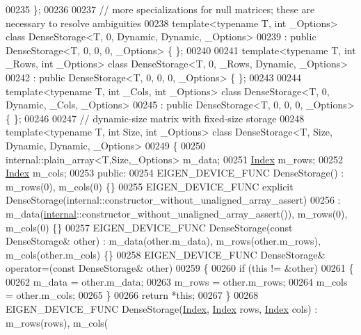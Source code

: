 \begin{DoxyCode}
00235 \};
00236 
00237 \textcolor{comment}{// more specializations for null matrices; these are necessary to resolve ambiguities}
00238 \textcolor{keyword}{template}<\textcolor{keyword}{typename} T, \textcolor{keywordtype}{int} \_Options> \textcolor{keyword}{class }DenseStorage<T, 0, Dynamic, Dynamic, \_Options>
00239 : \textcolor{keyword}{public} DenseStorage<T, 0, 0, 0, \_Options> \{ \};
00240 
00241 \textcolor{keyword}{template}<\textcolor{keyword}{typename} T, \textcolor{keywordtype}{int} \_Rows, \textcolor{keywordtype}{int} \_Options> \textcolor{keyword}{class }DenseStorage<T, 0, \_Rows, Dynamic, \_Options>
00242 : \textcolor{keyword}{public} DenseStorage<T, 0, 0, 0, \_Options> \{ \};
00243 
00244 \textcolor{keyword}{template}<\textcolor{keyword}{typename} T, \textcolor{keywordtype}{int} \_Cols, \textcolor{keywordtype}{int} \_Options> \textcolor{keyword}{class }DenseStorage<T, 0, Dynamic, \_Cols, \_Options>
00245 : \textcolor{keyword}{public} DenseStorage<T, 0, 0, 0, \_Options> \{ \};
00246 
00247 \textcolor{comment}{// dynamic-size matrix with fixed-size storage}
00248 \textcolor{keyword}{template}<\textcolor{keyword}{typename} T, \textcolor{keywordtype}{int} Size, \textcolor{keywordtype}{int} \_Options> \textcolor{keyword}{class }DenseStorage<T, Size, Dynamic, Dynamic, \_Options>
00249 \{
00250     internal::plain\_array<T,Size,\_Options> m\_data;
00251     \hyperlink{namespace_eigen_a62e77e0933482dafde8fe197d9a2cfde}{Index} m\_rows;
00252     \hyperlink{namespace_eigen_a62e77e0933482dafde8fe197d9a2cfde}{Index} m\_cols;
00253   \textcolor{keyword}{public}:
00254     EIGEN\_DEVICE\_FUNC DenseStorage() : m\_rows(0), m\_cols(0) \{\}
00255     EIGEN\_DEVICE\_FUNC \textcolor{keyword}{explicit} DenseStorage(internal::constructor\_without\_unaligned\_array\_assert)
00256       : m\_data(\hyperlink{namespaceinternal}{internal}::constructor\_without\_unaligned\_array\_assert()), m\_rows(0), m\_cols(0) \{\}
00257     EIGEN\_DEVICE\_FUNC DenseStorage(\textcolor{keyword}{const} DenseStorage& other) : m\_data(other.m\_data), m\_rows(other.m\_rows),
       m\_cols(other.m\_cols) \{\}
00258     EIGEN\_DEVICE\_FUNC DenseStorage& operator=(\textcolor{keyword}{const} DenseStorage& other) 
00259     \{ 
00260       \textcolor{keywordflow}{if} (\textcolor{keyword}{this} != &other)
00261       \{
00262         m\_data = other.m\_data;
00263         m\_rows = other.m\_rows;
00264         m\_cols = other.m\_cols;
00265       \}
00266       \textcolor{keywordflow}{return} *\textcolor{keyword}{this}; 
00267     \}
00268     EIGEN\_DEVICE\_FUNC DenseStorage(\hyperlink{namespace_eigen_a62e77e0933482dafde8fe197d9a2cfde}{Index}, \hyperlink{namespace_eigen_a62e77e0933482dafde8fe197d9a2cfde}{Index} rows, \hyperlink{namespace_eigen_a62e77e0933482dafde8fe197d9a2cfde}{Index} cols) : m\_rows(rows), m\_cols(

\end{DoxyCode}
